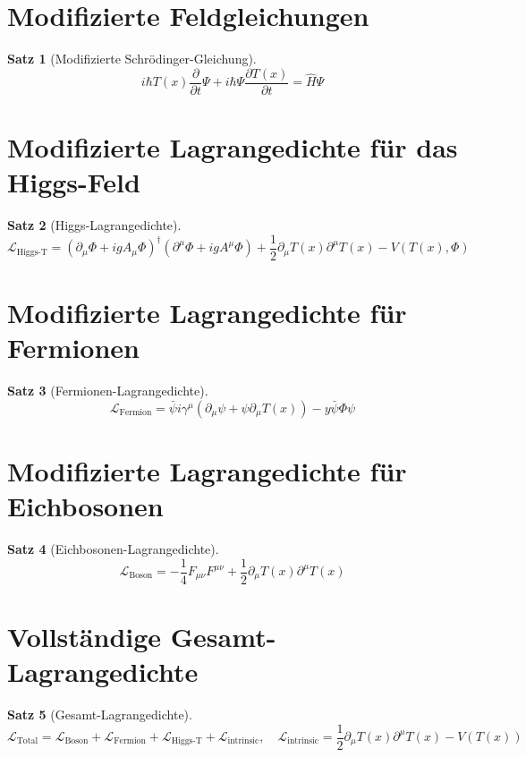 \documentclass{article}
\newcommand{\Tfield}{T(x)}
\newtheorem{theorem}{Satz}[section]
\theoremstyle{definition}
\theoremstyle{remark}
\begin{document}
	\section{Modifizierte Feldgleichungen}
	\begin{theorem}[Modifizierte Schrödinger-Gleichung]
		\begin{equation}
			i\hbar \Tfield \frac{\partial}{\partial t} \Psi + i\hbar \Psi \frac{\partial \Tfield}{\partial t} = \hat{H} \Psi
		\end{equation}
	\end{theorem}
	
	\section{Modifizierte Lagrangedichte für das Higgs-Feld}
	\begin{theorem}[Higgs-Lagrangedichte]
		\begin{equation}
			\mathcal{L}_{\text{Higgs-T}} = (\partial_\mu \Phi + ig A_\mu \Phi)^\dagger (\partial^\mu \Phi + ig A^\mu \Phi) + \frac{1}{2} \partial_\mu \Tfield \partial^\mu \Tfield - V(\Tfield, \Phi)
		\end{equation}
	\end{theorem}
	
	\section{Modifizierte Lagrangedichte für Fermionen}
	\begin{theorem}[Fermionen-Lagrangedichte]
		\begin{equation}
			\mathcal{L}_{\text{Fermion}} = \bar{\psi} i \gamma^\mu (\partial_\mu \psi + \psi \partial_\mu \Tfield) - y \bar{\psi} \Phi \psi
		\end{equation}
	\end{theorem}
	
	\section{Modifizierte Lagrangedichte für Eichbosonen}
	\begin{theorem}[Eichbosonen-Lagrangedichte]
		\begin{equation}
			\mathcal{L}_{\text{Boson}} = -\frac{1}{4} F_{\mu\nu} F^{\mu\nu} + \frac{1}{2} \partial_\mu \Tfield \partial^\mu \Tfield
		\end{equation}
	\end{theorem}
	
	\section{Vollständige Gesamt-Lagrangedichte}
	\begin{theorem}[Gesamt-Lagrangedichte]
		\begin{equation}
			\mathcal{L}_{\text{Total}} = \mathcal{L}_{\text{Boson}} + \mathcal{L}_{\text{Fermion}} + \mathcal{L}_{\text{Higgs-T}} + \mathcal{L}_{\text{intrinsic}}, \quad \mathcal{L}_{\text{intrinsic}} = \frac{1}{2} \partial_\mu \Tfield \partial^\mu \Tfield - V(\Tfield)
		\end{equation}
	\end{theorem}
	
\end{document}
